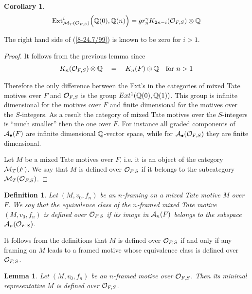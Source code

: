 \documentclass[10pt]{article}
\newtheorem{lemma}[theorem]{Lemma}
\newtheorem{corollary}[theorem]{Corollary}
\newtheorem{definition}[theorem]{Definition}
\begin{document}
\begin{corollary} \label{8-24.6/99} 
\begin{equation} \label{8-24.7/99}
{\rm Ext}^i_{{\cal M}_T({\cal O}_{F, S})}\Bigl({\mathbb Q}(0), {\mathbb Q}(n)\Bigr)  = 
gr^{\gamma}_nK_{2n-i}({\cal O}_{F, S})\otimes {\mathbb Q}
\end{equation}  
\end{corollary}

The right hand side of (\ref{8-24.7/99}) is known to be zero for $i>1$. 

\begin{proof} It follows from the previous lemma since 
$$
K_{n}({\cal O}_{F, S})\otimes {\mathbb Q} \quad =  \quad K_{n}(F)\otimes {\mathbb Q} \quad \mbox{for $n>1$}
$$ 

Therefore the only difference between the Ext's in the categories of mixed Tate motives over $F$ and ${\cal O}_{F, S}$ is the group $Ext^1({\mathbb Q}(0), {\mathbb Q}(1))$. This group is infinite dimensional for the motives over $F$ and finite dimensional for the motives over the $S$-integers. As a result the category of mixed Tate motives over the 
$S$-integers is ``much smaller'' 
then the one over $F$. For instance  all graded components of 
${\cal A}_{\bullet}(F)$ are infinite dimensional ${\mathbb Q}$-vector space, while 
for ${\cal A}_{\bullet}({\cal O}_{F, S})$ they are finite dimensional. 


Let $M$ be a mixed Tate motives over $F$, i.e. it is 
an object of the category ${\cal M}_{T}(F)$. We say that $M$ is defined over 
${\cal O}_{F, S}$ if it belongs to the subcategory ${\cal M}_{T}({\cal O}_{F, S})$. 


\end{proof}

\begin{definition}
Let $(M, v_0, f_n)$ be an $n$-framing on a mixed Tate motive $M$ over $F$. We say that 
the equivalence class of the $n$-framed mixed Tate motive $(M, v_0, f_n)$ 
is defined over ${\cal O}_{F, S}$ if its image in ${\cal A}_{n}(F)$ belongs to 
 the subspace ${\cal A}_{n}({\cal O}_{F, S})$. 
\end{definition}

It follows from the definitions that $M$ is defined over 
${\cal O}_{F, S}$ if and only if  any framing on $M$ leads to a framed 
motive whose  equivalence class is  
defined over 
${\cal O}_{F, S}$. 


\begin{lemma} \label{8-25/99}
Let $(M, v_0, f_n)$ be an $n$-framed motive over 
 ${\cal O}_{F, S}$. Then its minimal representative $\overline M$ is defined over ${\cal O}_{F, S}$.
\end{lemma}
\end{document}
